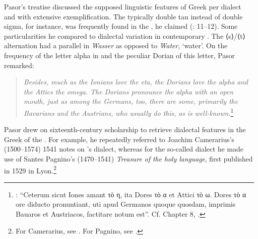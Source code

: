 Pasor’s treatise discussed the supposed linguistic features of  Greek per dialect and with extensive exemplification. The typically  double tau instead of double sigma, for instance, was frequently found in the , he claimed (\citealt{Pasor1632}: 11–12). Some particularities he compared to dialectal variation in contemporary . The ⟨s⟩/⟨t⟩ alternation had a parallel in  \textit{Wasser} as opposed to  \textit{Water}, ‘water’. On the frequency of the letter alpha in  and the peculiar Dorian  of this letter, Pasor remarked:

\begin{quote}
\emph{\textup{Besides,} \emph{much} \emph{as} \emph{the} \emph{Ionians} \emph{love} \emph{the} \emph{eta,} \emph{the} \emph{Dorians} \emph{love} \emph{the} \emph{alpha} \emph{and} \emph{the} \emph{Attics} \emph{the} \emph{omega.} \emph{The} \emph{Dorians} \emph{pronounce} \emph{the} \emph{alpha} \emph{with} \emph{an} \emph{open} \emph{mouth,} \emph{just} \emph{as} \emph{among} \emph{the} \emph{Germans,} \emph{too,} \emph{there} \emph{are} \emph{some,} \emph{primarily} \emph{the} \emph{Bavarians} \emph{and} \emph{the} \emph{Austrians,} \emph{who} \emph{usually} \emph{do} \emph{this,} \emph{as} \emph{is} \emph{well-known.}}\footnote{\citet[28]{Pasor1632}: “Ceterum sicut Iones amant τὸ η, ita Dores τὸ α et Attici τὸ ω. Dores τὸ α ore diducto pronuntiant, uti apud Germanos quoque quosdam, imprimis Bauaros et Austriacos, factitare notum est”. Cf. Chapter 8, .}
\end{quote}

Pasor drew on sixteenth-century scholarship to retrieve dialectal features in the Greek of the . For example, he repeatedly referred to Joachim Camerarius’s (1500–1574) 1541 notes on ’s  dialect, whereas for the so-called  dialect he made use of Santes Pagnino’s (1470–1541) \textit{Treasure of the holy language}, first published in 1529 in Lyon.\footnote{For Camerarius, see \citet[24--25, 27--28]{Pasor1632}. For Pagnino, see \citet[36]{Pasor1632}.}

